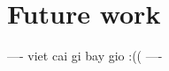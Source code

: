 \documentclass[conference]{IEEEtran}
\begin{document}
\section{Future work}
---- viet cai gi bay gio :(( ----












%
%
%
\FloatBarrier



\end{document}

